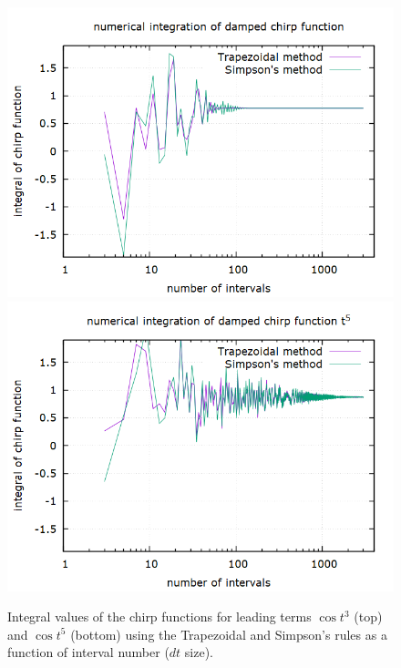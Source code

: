 \documentclass[aps,prl,twocolumn,superscriptaddress]{revtex4-1}
\begin{document}
\begin{figure}[htbp]
  	\begin{center}
  		\includegraphics[scale=0.3]{t3.png} 
 		\includegraphics[scale=0.3]{t5.png} 
  		\caption{Integral values of the chirp functions for leading terms $\cos t^3$ (top) and $\cos t^5$ (bottom) using the Trapezoidal and Simpson's rules as a function of interval number ($dt$ size).}
  		\label{gr:int}
 	\end{center}
\end{figure}
\end{document}
